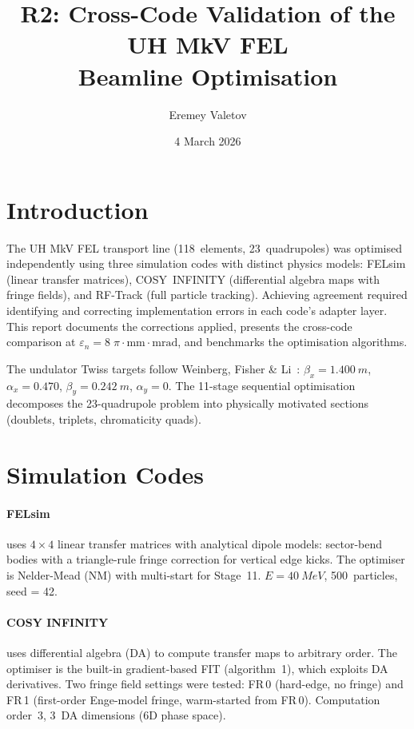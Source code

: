 \documentclass[11pt]{article}
\title{R2: Cross-Code Validation of the UH MkV FEL\\
  Beamline Optimisation}
\author{Eremey Valetov}
\date{4 March 2026}
\begin{document}
\maketitle

\section{Introduction}

The UH MkV FEL transport line (118~elements, 23~quadrupoles) was
optimised independently using three simulation codes with distinct
physics models: FELsim (linear transfer matrices), COSY~INFINITY
(differential algebra maps with fringe fields), and RF-Track (full
particle tracking).  Achieving agreement required identifying and
correcting implementation errors in each code's adapter layer.  This
report documents the corrections applied, presents the cross-code
comparison at $\varepsilon_n = 8\;\pi\cdot\text{mm}\cdot\text{mrad}$,
and benchmarks the optimisation algorithms.

The undulator Twiss targets follow Weinberg, Fisher \&
Li~\cite{weinberg2025}: $\beta_x = \SI{1.400}{m}$,
$\alpha_x = 0.470$, $\beta_y = \SI{0.242}{m}$, $\alpha_y = 0$.  The
11-stage sequential optimisation decomposes the 23-quadrupole problem
into physically motivated sections (doublets, triplets, chromaticity
quads).


\section{Simulation Codes}

\paragraph{FELsim} uses $4\times4$ linear transfer matrices with
analytical dipole models: sector-bend bodies with a triangle-rule
fringe correction for vertical edge kicks.  The optimiser is
Nelder-Mead (NM) with multi-start for Stage~11.
$E = \SI{40}{MeV}$, 500~particles, seed = 42.

\paragraph{COSY INFINITY} uses differential algebra (DA) to compute
transfer maps to arbitrary order.  The optimiser is the built-in
gradient-based FIT (algorithm~1), which exploits DA derivatives.
Two fringe field settings were tested: FR\,0 (hard-edge, no fringe)
and FR\,1 (first-order Enge-model fringe, warm-started from FR\,0).
Computation order~3, 3~DA dimensions (6D phase space).
\end{document}
